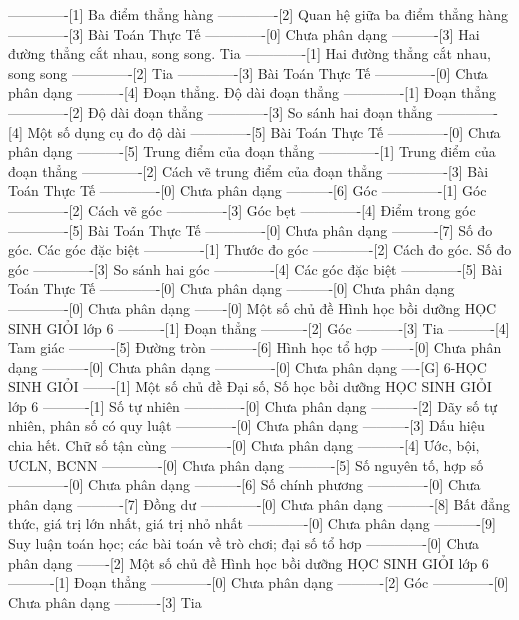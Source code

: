 -------------[1] Ba điểm thẳng hàng
-------------[2] Quan hệ giữa ba điểm thẳng hàng
-------------[3] Bài Toán Thực Tế
-------------[0] Chưa phân dạng
----------[3] Hai đường thẳng cắt nhau, song song. Tia
-------------[1] Hai đường thẳng cắt nhau, song song
-------------[2] Tia
-------------[3] Bài Toán Thực Tế
-------------[0] Chưa phân dạng
----------[4] Đoạn thẳng. Độ dài đoạn thẳng
-------------[1] Đoạn thẳng
-------------[2] Độ dài đoạn thẳng
-------------[3] So sánh hai đoạn thẳng
-------------[4] Một số dụng cụ đo độ dài
-------------[5] Bài Toán Thực Tế
-------------[0] Chưa phân dạng
----------[5] Trung điểm của đoạn thẳng
-------------[1] Trung điểm của đoạn thẳng
-------------[2] Cách vẽ trung điểm của đoạn thẳng
-------------[3] Bài Toán Thực Tế
-------------[0] Chưa phân dạng
----------[6] Góc
-------------[1] Góc
-------------[2] Cách vẽ góc
-------------[3] Góc bẹt
-------------[4] Điểm trong góc
-------------[5] Bài Toán Thực Tế
-------------[0] Chưa phân dạng
----------[7] Số đo góc. Các góc đặc biệt
-------------[1] Thước đo góc
-------------[2] Cách đo góc. Số đo góc
-------------[3] So sánh hai góc
-------------[4] Các góc đặc biệt
-------------[5] Bài Toán Thực Tế
-------------[0] Chưa phân dạng
----------[0] Chưa phân dạng
-------------[0] Chưa phân dạng
-------[0] Một số chủ đề Hình học bồi dưỡng HỌC SINH GIỎI lớp 6
----------[1] Đoạn thẳng
----------[2] Góc
----------[3] Tia
----------[4] Tam giác
----------[5] Đường tròn
----------[6] Hình học tổ hợp
-------[0] Chưa phân dạng
----------[0] Chưa phân dạng
-------------[0] Chưa phân dạng
----[G] 6-HỌC SINH GIỎI
-------[1] Một số chủ đề Đại số, Số học bồi dưỡng HỌC SINH GIỎI lớp 6
----------[1] Số tự nhiên
-------------[0] Chưa phân dạng
----------[2] Dãy số tự nhiên, phân số có quy luật
-------------[0] Chưa phân dạng
----------[3] Dấu hiệu chia hết. Chữ số tận cùng
-------------[0] Chưa phân dạng
----------[4] Ước, bội, ƯCLN, BCNN
-------------[0] Chưa phân dạng
----------[5] Số nguyên tố, hợp số
-------------[0] Chưa phân dạng
----------[6] Số chính phương
-------------[0] Chưa phân dạng
----------[7] Đồng dư
-------------[0] Chưa phân dạng
----------[8] Bất đẳng thức, giá trị lớn nhất, giá trị nhỏ nhất
-------------[0] Chưa phân dạng
----------[9] Suy luận toán học; các bài toán về trò chơi; đại số tổ hơp
-------------[0] Chưa phân dạng
-------[2] Một số chủ đề Hình học bồi dưỡng HỌC SINH GIỎI lớp 6
----------[1] Đoạn thẳng
-------------[0] Chưa phân dạng
----------[2] Góc
-------------[0] Chưa phân dạng
----------[3] Tia
